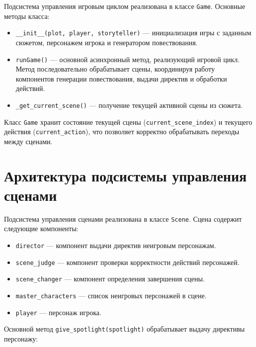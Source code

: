 Подсистема управления игровым циклом реализована в классе \texttt{Game}. Основные методы класса:

\begin{itemize}
	\item \texttt{\_\_init\_\_(plot, player, storyteller)} --- инициализация игры с заданным сюжетом, персонажем игрока и генератором повествования.
	
	\item \texttt{runGame()} --- основной асинхронный метод, реализующий игровой цикл. Метод последовательно обрабатывает сцены, координируя работу компонентов генерации повествования, выдачи директив и обработки действий.
	
	\item \texttt{\_get\_current\_scene()} --- получение текущей активной сцены из сюжета.
\end{itemize}

Класс \texttt{Game} хранит состояние текущей сцены (\texttt{current\_scene\_index}) и текущего действия (\texttt{current\_action}), что позволяет корректно обрабатывать переходы между сценами.

\section{Архитектура подсистемы управления сценами}

Подсистема управления сценами реализована в классе \texttt{Scene}. Сцена содержит следующие компоненты:

\begin{itemize}
	\item \texttt{director} --- компонент выдачи директив неигровым персонажам.
	
	\item \texttt{scene\_judge} --- компонент проверки корректности действий персонажей.
	
	\item \texttt{scene\_changer} --- компонент определения завершения сцены.
	
	\item \texttt{master\_characters} --- список неигровых персонажей в сцене.
	
	\item \texttt{player} --- персонаж игрока.
\end{itemize}

Основной метод \texttt{give\_spotlight(spotlight)} обрабатывает выдачу директивы персонажу:

